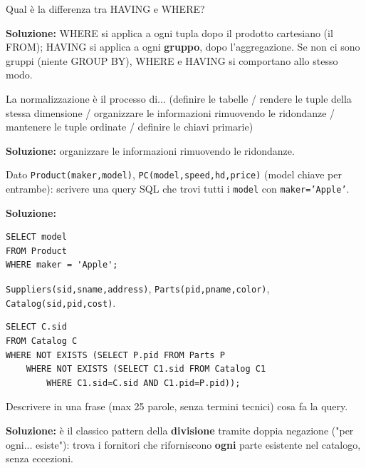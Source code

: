 \documentclass[12pt, a4paper]{article}
\begin{document}
\begin{tcolorbox}[colback=lightergray!10, colframe=tocsec, title=\textbf{Esercizio 20}]
Qual è la differenza tra HAVING e WHERE?
\end{tcolorbox}
\textbf{Soluzione:} WHERE si applica a ogni tupla dopo il prodotto cartesiano (il FROM); HAVING si applica a ogni \textbf{gruppo}, dopo l'aggregazione. Se non ci sono gruppi (niente GROUP BY), WHERE e HAVING si comportano allo stesso modo.

\begin{tcolorbox}[colback=lightergray!10, colframe=tocsec, title=\textbf{Esercizio 21}]
La normalizzazione è il processo di... (definire le tabelle / rendere le tuple della stessa dimensione / organizzare le informazioni rimuovendo le ridondanze / mantenere le tuple ordinate / definire le chiavi primarie)
\end{tcolorbox}
\textbf{Soluzione:} organizzare le informazioni rimuovendo le ridondanze.

\begin{tcolorbox}[colback=lightergray!10, colframe=tocsec, title=\textbf{Esercizio 22}]
Dato \texttt{Product(maker,model)}, \texttt{PC(model,speed,hd,price)} (model chiave per entrambe): scrivere una query SQL che trovi tutti i \texttt{model} con \texttt{maker='Apple'}.
\end{tcolorbox}
\textbf{Soluzione:}
\begin{verbatim}
SELECT model
FROM Product
WHERE maker = 'Apple';
\end{verbatim}

\begin{tcolorbox}[colback=lightergray!10, colframe=tocsec, title=\textbf{Esercizio 23}]
\texttt{Suppliers(sid,sname,address)}, \texttt{Parts(pid,pname,color)}, \texttt{Catalog(sid,pid,cost)}.
\begin{verbatim}
SELECT C.sid
FROM Catalog C
WHERE NOT EXISTS (SELECT P.pid FROM Parts P
    WHERE NOT EXISTS (SELECT C1.sid FROM Catalog C1
        WHERE C1.sid=C.sid AND C1.pid=P.pid));
\end{verbatim}
Descrivere in una frase (max 25 parole, senza termini tecnici) cosa fa la query.
\end{tcolorbox}
\textbf{Soluzione:} è il classico pattern della \textbf{divisione} tramite doppia negazione ("per ogni... esiste"): trova i fornitori che riforniscono \textbf{ogni} parte esistente nel catalogo, senza eccezioni.
\end{document}
